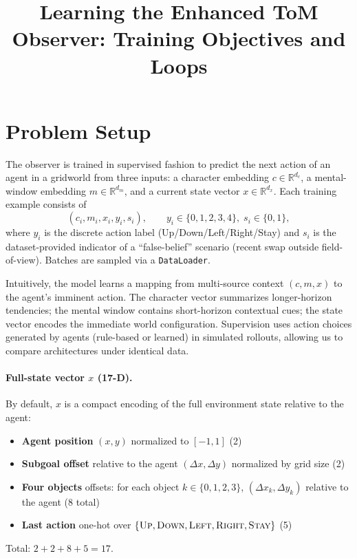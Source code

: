 \documentclass[11pt]{article}
\title{Learning the Enhanced ToM Observer: Training Objectives and Loops}
\author{}
\date{}
\begin{document}
\maketitle

\section{Problem Setup}

The observer is trained in supervised fashion to predict the next action of an agent in a gridworld from three inputs: a character embedding $c\in\mathbb{R}^{d_c}$, a mental-window embedding $m\in\mathbb{R}^{d_m}$, and a current state vector $x\in\mathbb{R}^{d_x}$. Each training example consists of
\[
  (c_i, m_i, x_i, y_i, s_i),\qquad y_i\in\{0,1,2,3,4\},\; s_i\in\{0,1\},
\]
where $y_i$ is the discrete action label (Up/Down/Left/Right/Stay) and $s_i$ is the dataset-provided indicator of a ``false-belief'' scenario (recent swap outside field-of-view). Batches are sampled via a \texttt{DataLoader}.

Intuitively, the model learns a mapping from multi-source context $(c,m,x)$ to the agent's imminent action. The character vector summarizes longer-horizon tendencies; the mental window contains short-horizon contextual cues; the state vector encodes the immediate world configuration. Supervision uses action choices generated by agents (rule-based or learned) in simulated rollouts, allowing us to compare architectures under identical data.

\paragraph{Full-state vector $x$ (17-D).} By default, $x$ is a compact encoding of the full environment state relative to the agent:
\begin{itemize}
  \item \textbf{Agent position} $(x,y)$ normalized to $[-1,1]$ (2)
  \item \textbf{Subgoal offset} relative to the agent $(\Delta x,\Delta y)$ normalized by grid size (2)
  \item \textbf{Four objects} offsets: for each object $k\in\{0,1,2,3\}$, $(\Delta x_k,\Delta y_k)$ relative to the agent (8 total)
  \item \textbf{Last action} one-hot over $\{\textsc{Up},\textsc{Down},\textsc{Left},\textsc{Right},\textsc{Stay}\}$ (5)
\end{itemize}
Total: $2+2+8+5=17$.
\end{document}
